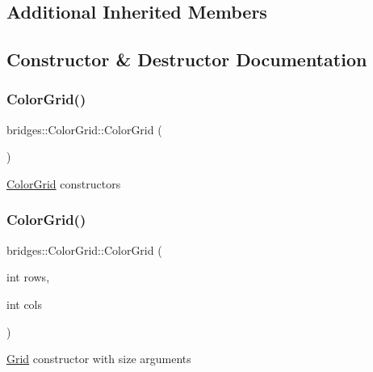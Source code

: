 \subsection*{Additional Inherited Members}


\subsection{Constructor \& Destructor Documentation}
\mbox{\label{classbridges_1_1_color_grid_a00f6ca6b903228b78538a9f0511ffe46}} 
\subsubsection{\texorpdfstring{Color\+Grid()}{ColorGrid()}\hspace{0.1cm}{\footnotesize\ttfamily [1/4]}}
{\footnotesize\ttfamily bridges\+::\+Color\+Grid\+::\+Color\+Grid (\begin{DoxyParamCaption}{ }\end{DoxyParamCaption})\hspace{0.3cm}{\ttfamily [inline]}}

\mbox{\hyperlink{classbridges_1_1_color_grid}{Color\+Grid}} constructors \mbox{\label{classbridges_1_1_color_grid_ac5fb993701683939d96fd7ac6515efc3}} 
\subsubsection{\texorpdfstring{Color\+Grid()}{ColorGrid()}\hspace{0.1cm}{\footnotesize\ttfamily [2/4]}}
{\footnotesize\ttfamily bridges\+::\+Color\+Grid\+::\+Color\+Grid (\begin{DoxyParamCaption}\item[{int}]{rows,  }\item[{int}]{cols }\end{DoxyParamCaption})\hspace{0.3cm}{\ttfamily [inline]}}

\mbox{\hyperlink{classbridges_1_1_grid}{Grid}} constructor with size arguments


